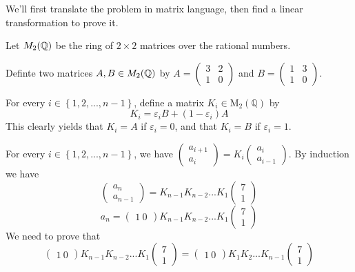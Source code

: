 	\begin{solution}
		We'll first translate the problem in matrix language, then find a linear transformation to prove it.
		
		\begin{solution_def}
			Let $ M_2(\mathbb{Q}) $ be the ring of $ 2\times 2 $ matrices over the rational numbers. 
			
			Definte two matrices $ A, B \in M_2(\mathbb{Q}) $ by $A=\left(\begin{array}{cc} 3&2\\ 1&0\end{array}\right)$ and $B=\left(\begin{array}{cc} 1&3\\ 1&0\end{array}\right)$.
			
			For every $i\in\left\{1,2,...,n-1\right\}$, define a matrix $K_i\in \mathrm{M}_2\left(\mathbb Q\right)$ by \[K_i=\varepsilon_i B + \left(1-\varepsilon_i\right) A\]This clearly yields that $K_i=A$ if $\varepsilon_i=0$, and that $K_i=B$ if $\varepsilon_i=1$.
			
			For every $i\in\left\{1,2,...,n-1\right\}$, we have $\left(\begin{array}{c} a_{i+1}\\ a_i\end{array}\right) = K_i \left(\begin{array}{c} a_{i}\\ a_{i-1}\end{array}\right)$. By induction we have 
			\[\left(\begin{array}{c} a_{n}\\ a_{n-1}\end{array}\right) =K_{n-1}K_{n-2}...K_1\left(\begin{array}{c} 7\\ 1\end{array}\right)\]
			\[a_n=\left(\begin{array}{cc} 1\ 0 \end{array}\right) K_{n-1}K_{n-2}...K_1\left(\begin{array}{c} 7\\ 1\end{array}\right)\]
			We need to prove that
			\[\left(\begin{array}{cc} 1\ 0 \end{array}\right) K_{n-1}K_{n-2}...K_1\left(\begin{array}{c} 7\\ 1\end{array}\right) = \left(\begin{array}{cc} 1\ 0 \end{array}\right) K_1K_2...K_{n-1}\left(\begin{array}{c} 7\\ 1\end{array}\right)\]
		\end{solution_def}
		

\end{solution}
